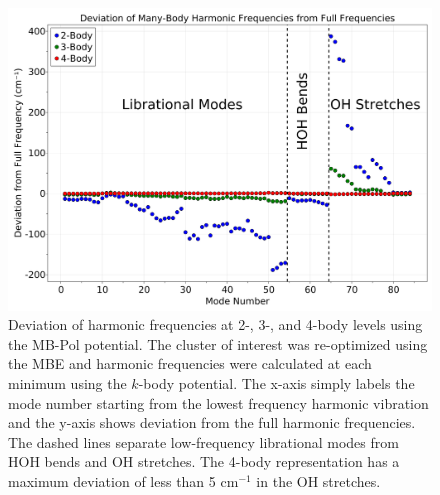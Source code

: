 \begin{figure}[h]
\uwsinglespace
\begin{center}
\begin{minipage}{0.8\textwidth}
\includegraphics[width=\textwidth]{Figures/Chapter_4/ch4_figure_7.png}
\end{minipage}
\end{center}
\caption[Deviation of harmonic frequencies at 2-, 3-, and 4-body levels using the MB-Pol potential. The  cluster of interest was re-optimized using the MBE and harmonic frequencies were calculated at each minimum using the $k$-body potential.]{Deviation of harmonic frequencies at 2-, 3-, and 4-body levels using the MB-Pol potential. The  cluster of interest was re-optimized using the MBE and harmonic frequencies were calculated at each minimum using the $k$-body potential. The x-axis simply labels the mode number starting from the lowest frequency harmonic vibration and the y-axis shows deviation from the full harmonic frequencies. The dashed lines separate low-frequency librational modes from HOH bends and OH stretches. The 4-body representation has a maximum deviation of less than 5 $\mathrm{cm}^{-1}$ in the OH stretches.}
\label{fig:MBE_MD_F7}
\end{figure}